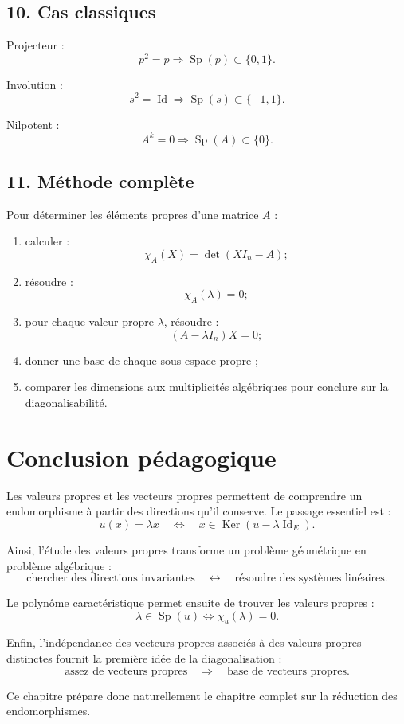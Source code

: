 \documentclass[11pt,a4paper]{article}
\newcommand{\Ker}{\operatorname{Ker}}
\newcommand{\Id}{\operatorname{Id}}
\newcommand{\Sp}{\operatorname{Sp}}
\begin{document}
\subsection*{10. Cas classiques}

Projecteur :
\[
p^2=p
\Longrightarrow
\Sp(p)\subset\{0,1\}.
\]

Involution :
\[
s^2=\Id
\Longrightarrow
\Sp(s)\subset\{-1,1\}.
\]

Nilpotent :
\[
A^k=0
\Longrightarrow
\Sp(A)\subset\{0\}.
\]

\subsection*{11. Méthode complète}

Pour déterminer les éléments propres d'une matrice \(A\) :
\begin{enumerate}
    \item calculer :
    \[
    \chi_A(X)=\det(XI_n-A);
    \]
    \item résoudre :
    \[
    \chi_A(\lambda)=0;
    \]
    \item pour chaque valeur propre \(\lambda\), résoudre :
    \[
    (A-\lambda I_n)X=0;
    \]
    \item donner une base de chaque sous-espace propre ;
    \item comparer les dimensions aux multiplicités algébriques pour conclure sur la diagonalisabilité.
\end{enumerate}

\section*{Conclusion pédagogique}

Les valeurs propres et les vecteurs propres permettent de comprendre un endomorphisme à partir des directions qu'il conserve.  
Le passage essentiel est :
\[
u(x)=\lambda x
\quad\Longleftrightarrow\quad
x\in\Ker(u-\lambda\Id_E).
\]

Ainsi, l'étude des valeurs propres transforme un problème géométrique en problème algébrique :
\[
\text{chercher des directions invariantes}
\quad\longleftrightarrow\quad
\text{résoudre des systèmes linéaires}.
\]

Le polynôme caractéristique permet ensuite de trouver les valeurs propres :
\[
\lambda\in\Sp(u)
\Longleftrightarrow
\chi_u(\lambda)=0.
\]

Enfin, l'indépendance des vecteurs propres associés à des valeurs propres distinctes fournit la première idée de la diagonalisation :
\[
\text{assez de vecteurs propres}
\quad\Longrightarrow\quad
\text{base de vecteurs propres}.
\]

Ce chapitre prépare donc naturellement le chapitre complet sur la réduction des endomorphismes.
\end{document}
